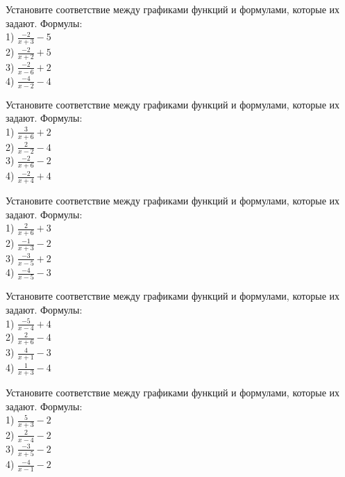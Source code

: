 \documentclass[4apaper]{article}
\begin{document}
\begin{taskBN}{41}
Установите соответствие между графиками функций и формулами, которые их задают. Формулы: \\1) $\frac{-2}{x+3}-5$\\2) $\frac{-2}{x+2}+5$\\3) $\frac{-2}{x-6}+2$\\4) $\frac{-4}{x-2}-4$
\end{taskBN}

\begin{taskBN}{42}
Установите соответствие между графиками функций и формулами, которые их задают. Формулы: \\1) $\frac{3}{x+6}+2$\\2) $\frac{2}{x-2}-4$\\3) $\frac{-2}{x+6}-2$\\4) $\frac{-2}{x+4}+4$
\end{taskBN}

\begin{taskBN}{43}
Установите соответствие между графиками функций и формулами, которые их задают. Формулы: \\1) $\frac{2}{x+6}+3$\\2) $\frac{-1}{x+3}-2$\\3) $\frac{-3}{x-5}+2$\\4) $\frac{-4}{x-5}-3$
\end{taskBN}

\begin{taskBN}{44}
Установите соответствие между графиками функций и формулами, которые их задают. Формулы: \\1) $\frac{-5}{x-4}+4$\\2) $\frac{2}{x+6}-4$\\3) $\frac{4}{x+1}-3$\\4) $\frac{1}{x+3}-4$
\end{taskBN}

\begin{taskBN}{45}
Установите соответствие между графиками функций и формулами, которые их задают. Формулы: \\1) $\frac{5}{x+3}-2$\\2) $\frac{2}{x-4}-2$\\3) $\frac{-3}{x+5}-2$\\4) $\frac{-4}{x-1}-2$
\end{taskBN}
\end{document}
